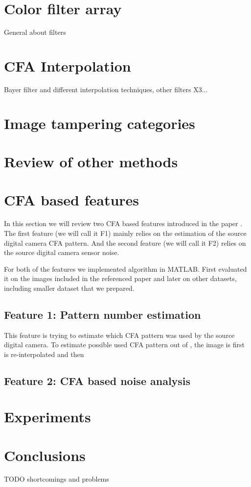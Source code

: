 \documentclass{template/acm_proc_article-sp}
\begin{document}
\section{Color filter array}
General about filters


\section{CFA Interpolation}
Bayer filter and different interpolation techniques, other filters X3...

\section{Image tampering categories}

\section{Review of other methods}


\section{CFA based features}
In this section we will review two CFA based features introduced in the paper \cite{dirik2009image}. The first feature (we will call it F1) mainly relies on the estimation of the source digital camera CFA pattern. And the second feature (we will call it F2) relies on the source digital camera sensor noise.

For both of the features we implemented algorithm in MATLAB. First evaluated it on the images included in the referenced paper \cite{dirik2009image} and later on other datasets, including smaller dataset that we prepared.

\subsection{Feature 1: Pattern number estimation}
This feature is trying to estimate which CFA pattern was used by the source digital camera. To estimate possible used CFA pattern out of , the image is first  is re-interpolated and then

\subsection{Feature 2: CFA based noise analysis}

\section{Experiments}

\section{Conclusions}
TODO
shortcomings and problems



\end{document}
